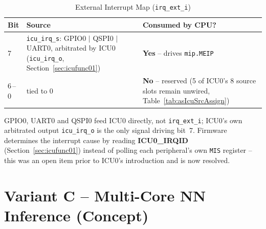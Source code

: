 \begin{table}[H]
\caption{External Interrupt Map (\texttt{irq\_ext\_i})}
\label{tab:irqmap}
\centering
{\footnotesize
\begin{tabularx}{\textwidth}{|l |X |X|}
  \hline
  Bit & Source & Consumed by CPU? \\
  \hline
  \hline
  7 &     \texttt{icu\_irq\_s}: GPIO0 $\vert$ QSPI0 $\vert$ UART0, arbitrated by
    ICU0 (\texttt{icu\_irq\_o}, Section~\ref{sec:icufunc01}) &
    \textbf{Yes} -- drives \texttt{mip.MEIP} \\
  \hline
  6\,--\,0 & tied to 0 &
    \textbf{No} -- reserved (5 of ICU0's 8 source slots remain
    unwired, Table~\ref{tab:asIcuSrcAssign}) \\
  \hline
\end{tabularx}}
\end{table}

GPIO0, UART0 and QSPI0 feed
ICU0 directly, not \texttt{irq\_ext\_i}; ICU0's own arbitrated output
\texttt{icu\_irq\_o} is the only signal driving bit~7. Firmware
determines the interrupt cause by reading \textbf{ICU0\_IRQID}
(Section~\ref{sec:icufunc01}) instead of polling each peripheral's own
\texttt{MIS} register -- this was an open item prior to ICU0's
introduction and is now resolved.

\chapter{Variant C -- Multi-Core NN Inference (Concept)}

